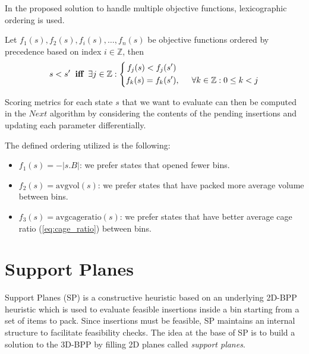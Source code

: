 In the proposed solution to handle multiple objective functions, lexicographic ordering is used.
\begin{definition}
    \label{def:lexicographic_ordering}
    Let $f_1(s), f_2(s), f_i(s), \dots, f_n(s)$ be objective functions ordered by precedence based on index $i \in \mathbb{Z}$, then 
    \begin{equation*}
        s < s^\prime \hspace{.2cm} \textbf{iff} \hspace{.2cm} \exists j \in \mathbb{Z} : \left\{
            \begin{aligned}
                f_j(s) < f_j(s^\prime) & \\
                f_k(s) = f_k(s^\prime) &,\hspace{.5cm} \forall k \in \mathbb{Z} : 0 \le k < j 
            \end{aligned}
        \right.
    \end{equation*}
\end{definition}

Scoring metrics for each state $s$ that we want to evaluate can then be computed in the $Next$ algorithm by considering the contents of the pending insertions and updating each parameter differentially.

The defined ordering utilized is the following:
\begin{itemize}
    \item $f_1(s) = -|s.B|$: we prefer states that opened fewer bins.
    \item $f_2(s) = \text{avgvol}(s)$: we prefer states that have packed more average volume between bins.
    \item $f_3(s) = \text{avgcageratio}(s)$: we prefer states that have better average cage ratio (\cref{eq:cage_ratio}) between bins.
\end{itemize}

\section{Support Planes}
\label{sec:support_planes}%
Support Planes (SP) is a constructive heuristic based on an underlying 2D-BPP heuristic which is used to evaluate feasible insertions inside a bin starting from a set of items to pack.
Since insertions must be feasible, SP maintains an internal structure to facilitate feasibility checks.
The idea at the base of SP is to build a solution to the 3D-BPP by filling 2D planes called \textit{support planes}.

